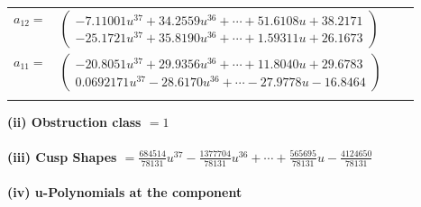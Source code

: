\documentclass[1p]{elsarticle_modified}
\theoremstyle{definition}
\begin{document}
\begin{tabular}{m{7pt} m{180pt} m{7pt} m{180pt} }
\flushright $a_{12}=$&$\begin{pmatrix}-7.11001 u^{37}+34.2559 u^{36}+\cdots+51.6108 u+38.2171\\-25.1721 u^{37}+35.8190 u^{36}+\cdots+1.59311 u+26.1673\end{pmatrix}$ \\
\flushright $a_{11}=$&$\begin{pmatrix}-20.8051 u^{37}+29.9356 u^{36}+\cdots+11.8040 u+29.6783\\0.0692171 u^{37}-28.6170 u^{36}+\cdots-27.9778 u-16.8464\end{pmatrix}$\\&\end{tabular}
\flushleft \textbf{(ii) Obstruction class $= 1$}\\~\\
\flushleft \textbf{(iii) Cusp Shapes $= \frac{684514}{78131} u^{37}-\frac{1377704}{78131} u^{36}+\cdots+\frac{565695}{78131} u-\frac{4124650}{78131}$}\\~\\
\newpage\renewcommand{\arraystretch}{1}
\flushleft \textbf{(iv) u-Polynomials at the component}\newline \\
\end{document}
